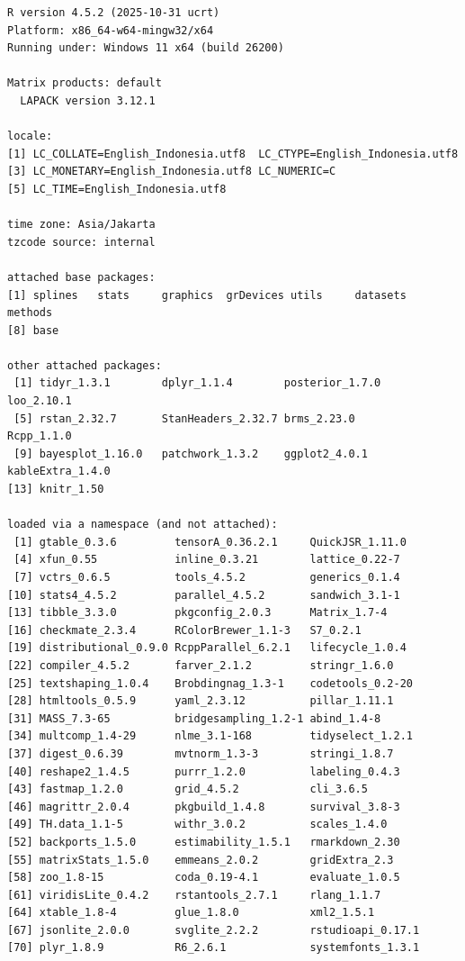 \documentclass[
]{article}
\begin{document}
\begin{verbatim}
R version 4.5.2 (2025-10-31 ucrt)
Platform: x86_64-w64-mingw32/x64
Running under: Windows 11 x64 (build 26200)

Matrix products: default
  LAPACK version 3.12.1

locale:
[1] LC_COLLATE=English_Indonesia.utf8  LC_CTYPE=English_Indonesia.utf8   
[3] LC_MONETARY=English_Indonesia.utf8 LC_NUMERIC=C                      
[5] LC_TIME=English_Indonesia.utf8    

time zone: Asia/Jakarta
tzcode source: internal

attached base packages:
[1] splines   stats     graphics  grDevices utils     datasets  methods  
[8] base     

other attached packages:
 [1] tidyr_1.3.1        dplyr_1.1.4        posterior_1.7.0    loo_2.10.1        
 [5] rstan_2.32.7       StanHeaders_2.32.7 brms_2.23.0        Rcpp_1.1.0        
 [9] bayesplot_1.16.0   patchwork_1.3.2    ggplot2_4.0.1      kableExtra_1.4.0  
[13] knitr_1.50        

loaded via a namespace (and not attached):
 [1] gtable_0.3.6         tensorA_0.36.2.1     QuickJSR_1.11.0     
 [4] xfun_0.55            inline_0.3.21        lattice_0.22-7      
 [7] vctrs_0.6.5          tools_4.5.2          generics_0.1.4      
[10] stats4_4.5.2         parallel_4.5.2       sandwich_3.1-1      
[13] tibble_3.3.0         pkgconfig_2.0.3      Matrix_1.7-4        
[16] checkmate_2.3.4      RColorBrewer_1.1-3   S7_0.2.1            
[19] distributional_0.9.0 RcppParallel_6.2.1   lifecycle_1.0.4     
[22] compiler_4.5.2       farver_2.1.2         stringr_1.6.0       
[25] textshaping_1.0.4    Brobdingnag_1.3-1    codetools_0.2-20    
[28] htmltools_0.5.9      yaml_2.3.12          pillar_1.11.1       
[31] MASS_7.3-65          bridgesampling_1.2-1 abind_1.4-8         
[34] multcomp_1.4-29      nlme_3.1-168         tidyselect_1.2.1    
[37] digest_0.6.39        mvtnorm_1.3-3        stringi_1.8.7       
[40] reshape2_1.4.5       purrr_1.2.0          labeling_0.4.3      
[43] fastmap_1.2.0        grid_4.5.2           cli_3.6.5           
[46] magrittr_2.0.4       pkgbuild_1.4.8       survival_3.8-3      
[49] TH.data_1.1-5        withr_3.0.2          scales_1.4.0        
[52] backports_1.5.0      estimability_1.5.1   rmarkdown_2.30      
[55] matrixStats_1.5.0    emmeans_2.0.2        gridExtra_2.3       
[58] zoo_1.8-15           coda_0.19-4.1        evaluate_1.0.5      
[61] viridisLite_0.4.2    rstantools_2.7.1     rlang_1.1.7         
[64] xtable_1.8-4         glue_1.8.0           xml2_1.5.1          
[67] jsonlite_2.0.0       svglite_2.2.2        rstudioapi_0.17.1   
[70] plyr_1.8.9           R6_2.6.1             systemfonts_1.3.1   
\end{verbatim}
\end{document}
